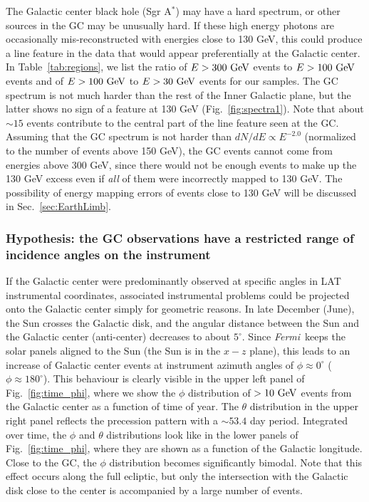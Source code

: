 \documentclass[aps,twocolumn,prd,superscriptaddress,showpacs,nofootinbib,fixfloat]{revtex4}
\newcommand{\Fermi}{{\slshape Fermi}}
\newcommand{\GeV}{{\rm ~GeV}}
\begin{document}
The Galactic center black hole (Sgr A$^*$) may have a hard spectrum, or other
sources in the GC may be unusually hard. If these high energy
photons are occasionally mis-reconstructed with energies
close to 130 GeV, this could produce a line feature in the
data that would appear preferentially at the Galactic center.
In Table~\ref{tab:regions}, we list the ratio of $E>300\GeV$
events to $E>100\GeV$ events and of $E>100\GeV$ to $E>30\GeV$
events for our samples.  The
GC spectrum is not much harder than the rest of the Inner Galactic
plane, but the latter shows no sign of a feature at 130 GeV
(Fig.~\ref{fig:spectra1}). Note that
about $\sim15$ events contribute to the central part of the
line feature seen at the GC. Assuming that the GC spectrum is not
harder than $dN/dE \propto E^{-2.0}$ (normalized to the
number of events above 150 GeV), the GC events cannot come
from energies above 300 GeV, since there would not be enough
events to make up the 130 GeV excess even if \emph{all} of
them were incorrectly mapped to 130 GeV. The possibility of energy
mapping errors of events close to 130 GeV will be discussed
in Sec.~\ref{sec:EarthLimb}.

\subsubsection{Hypothesis: the GC observations have a
restricted range of incidence angles on the instrument}

If the Galactic center were predominantly observed at
specific angles in LAT instrumental coordinates, associated
instrumental problems could be projected onto the Galactic
center simply for geometric reasons. 
In late December (June), the Sun crosses the Galactic disk,
and the angular
distance between the Sun and the Galactic center
(anti-center) decreases to about $5^\circ$. Since \Fermi\ keeps
the solar panels aligned to the Sun (the Sun is in the $x-z$ plane), this
leads to an
increase of Galactic center events at instrument azimuth
angles of $\phi\approx 0^\circ$ ($\phi\approx 180^\circ$).
This behaviour is clearly visible in the upper left panel of
Fig.~\ref{fig:time_phi}, where we show the $\phi$
distribution of $>10\GeV$ events from the Galactic center as
a function of time of year.  The $\theta$
distribution in the upper right panel reflects the
precession pattern with a $\sim53.4$ day period. Integrated
over time, the $\phi$ and $\theta$ distributions look like
in the lower panels of Fig.~\ref{fig:time_phi}, where they
are shown as a function of the Galactic longitude. Close to
the GC, the $\phi$ distribution becomes significantly
bimodal. Note that this effect occurs along the full 
ecliptic,
but only the intersection with the Galactic disk
close to the center is accompanied by a large number of
events.
\end{document}
